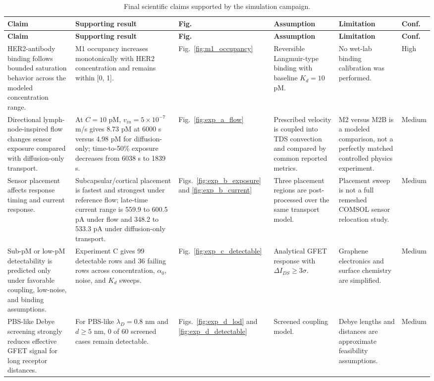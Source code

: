 
\begingroup\scriptsize\setlength{\tabcolsep}{2pt}
\begin{longtable}{@{}p{}p{}p{}p{}p{}p{}@{}}
\caption{Final scientific claims supported by the simulation campaign.}\label{tab:final_claims}\\
\toprule
\textbf{Claim} & \textbf{Supporting result} & \textbf{Fig.} & \textbf{Assumption} & \textbf{Limitation} & \textbf{Conf.}\\
\midrule
\endfirsthead
\toprule
\textbf{Claim} & \textbf{Supporting result} & \textbf{Fig.} & \textbf{Assumption} & \textbf{Limitation} & \textbf{Conf.}\\
\midrule
\endhead
HER2-antibody binding follows bounded saturation behavior across the modeled concentration range. & M1 occupancy increases monotonically with HER2 concentration and remains within [0, 1]. & Fig.~\ref{fig:m1_occupancy} & Reversible Langmuir-type binding with baseline $K_d=10$ pM. & No wet-lab binding calibration was performed. & High\\
Directional lymph-node-inspired flow changes sensor exposure compared with diffusion-only transport. & At $C=10$ pM, $v_{in}=5\times10^{-7}$ m/s gives 8.73 pM at 6000 s versus 4.98 pM for diffusion-only; time-to-50\% exposure decreases from 6038 s to 1839 s. & Fig.~\ref{fig:exp_a_flow} & Prescribed velocity is coupled into TDS convection and compared by common reported metrics. & M2 versus M2B is a modeled comparison, not a perfectly matched controlled physics experiment. & Medium\\
Sensor placement affects response timing and current response. & Subcapsular/cortical placement is fastest and strongest under reference flow; late-time current range is 559.9 to 600.5 pA under flow and 348.2 to 533.3 pA under diffusion-only transport. & Figs.~\ref{fig:exp_b_exposure} and \ref{fig:exp_b_current} & Three placement regions are post-processed over the same transport model. & Placement sweep is not a full remeshed COMSOL sensor relocation study. & Medium\\
Sub-pM or low-pM detectability is predicted only under favorable coupling, low-noise, and binding assumptions. & Experiment C gives 99 detectable rows and 36 failing rows across concentration, $\alpha_0$, noise, and $K_d$ sweeps. & Fig.~\ref{fig:exp_c_detectable} & Analytical GFET response with $\Delta I_{DS}\geq3\sigma$. & Graphene electronics and surface chemistry are simplified. & Medium\\
PBS-like Debye screening strongly reduces effective GFET signal for long receptor distances. & For PBS-like $\lambda_D=0.8$ nm and $d\geq5$ nm, 0 of 60 screened cases remain detectable. & Figs.~\ref{fig:exp_d_lod} and \ref{fig:exp_d_detectable} & Screened coupling model. & Debye lengths and distances are approximate feasibility assumptions. & Medium\\

\end{longtable}
